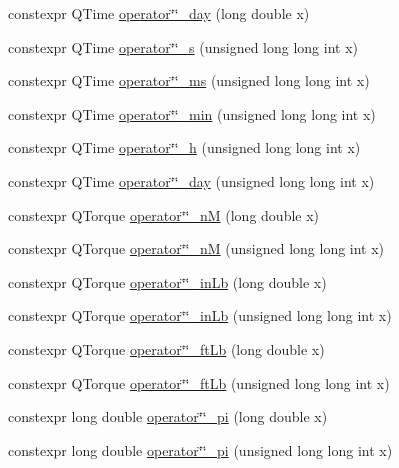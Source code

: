 \begin{DoxyCompactItemize}
\item 
constexpr Q\+Time \mbox{\hyperlink{namespaceokapi_1_1literals_a399e9f29b15b5e34ea3577f011a3ca28}{operator\char`\"{}\char`\"{}\+\_\+day}} (long double x)
\item 
constexpr Q\+Time \mbox{\hyperlink{namespaceokapi_1_1literals_a52e2803db21d89b8f608c32ad57a1d1d}{operator\char`\"{}\char`\"{}\+\_\+s}} (unsigned long long int x)
\item 
constexpr Q\+Time \mbox{\hyperlink{namespaceokapi_1_1literals_a3051bde71591186f767c4f1000044b5e}{operator\char`\"{}\char`\"{}\+\_\+ms}} (unsigned long long int x)
\item 
constexpr Q\+Time \mbox{\hyperlink{namespaceokapi_1_1literals_ae9718c12341692e929cde7bedcc55e4a}{operator\char`\"{}\char`\"{}\+\_\+min}} (unsigned long long int x)
\item 
constexpr Q\+Time \mbox{\hyperlink{namespaceokapi_1_1literals_a0d7788ca50c37d059b79a6d8363ea0f9}{operator\char`\"{}\char`\"{}\+\_\+h}} (unsigned long long int x)
\item 
constexpr Q\+Time \mbox{\hyperlink{namespaceokapi_1_1literals_a323a83894d9b82367a9a5e4ed103bb42}{operator\char`\"{}\char`\"{}\+\_\+day}} (unsigned long long int x)
\item 
constexpr Q\+Torque \mbox{\hyperlink{namespaceokapi_1_1literals_ac65b950fcec6f63f51fb8aa139cd43ec}{operator\char`\"{}\char`\"{}\+\_\+nM}} (long double x)
\item 
constexpr Q\+Torque \mbox{\hyperlink{namespaceokapi_1_1literals_a433bada2f177e78607acb15e2953668c}{operator\char`\"{}\char`\"{}\+\_\+nM}} (unsigned long long int x)
\item 
constexpr Q\+Torque \mbox{\hyperlink{namespaceokapi_1_1literals_aaa3c99e6571a76cd4088d2d55afd357d}{operator\char`\"{}\char`\"{}\+\_\+in\+Lb}} (long double x)
\item 
constexpr Q\+Torque \mbox{\hyperlink{namespaceokapi_1_1literals_a7bb3fd8e274b246c16fb5d7189e280dc}{operator\char`\"{}\char`\"{}\+\_\+in\+Lb}} (unsigned long long int x)
\item 
constexpr Q\+Torque \mbox{\hyperlink{namespaceokapi_1_1literals_ae51975f311fd3f3cc34443344f430dec}{operator\char`\"{}\char`\"{}\+\_\+ft\+Lb}} (long double x)
\item 
constexpr Q\+Torque \mbox{\hyperlink{namespaceokapi_1_1literals_a0bb5a987b1cc3e5f511cc5db14d29f8d}{operator\char`\"{}\char`\"{}\+\_\+ft\+Lb}} (unsigned long long int x)
\item 
constexpr long double \mbox{\hyperlink{namespaceokapi_1_1literals_a40698358b7eaa4c223ff8b0076249f4e}{operator\char`\"{}\char`\"{}\+\_\+pi}} (long double x)
\item 
constexpr long double \mbox{\hyperlink{namespaceokapi_1_1literals_a32a563b32efa7e39480f90e5b9db8e6a}{operator\char`\"{}\char`\"{}\+\_\+pi}} (unsigned long long int x)
\end{DoxyCompactItemize}


